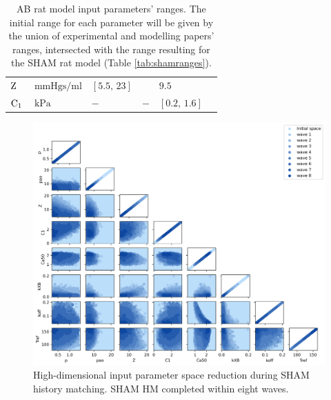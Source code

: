 \begin{landscape}
\begin{table}
\begin{tabularx}{2\textwidth}{llllll}
    $\textrm{Z}$                                                & $\SI{}{\mmHg\second\per\milli\litre}$ & $[5.5,\,23]$ & \cite{Kobayashi:1996, Yin:1980, Ioannou:2009} & $9.5$ & \cite{Lewalle:2018} \\
    $\textrm{C}_1$                                              & $\SI{}{\kilo\pascal}$                 & $-$ & $-$ & $[0.2,\,1.6]$ & \cite{Lewalle:2018} \\
    \bottomrule
    \end{tabularx}
    \caption{AB rat model input parameters' ranges. The initial range for each parameter will be given by the union of experimental and modelling papers' ranges, intersected with the range resulting for the SHAM rat model (Table \ref{tab:shamranges}).}
    \label{tab:abranges}
\end{table}
\end{landscape}


\begin{figure}[!ht]
    \myfloatalign
    \includegraphics[width=\textwidth]{figures/chapter04/hm_sham.png}
    \caption{High-dimensional input parameter space reduction during SHAM history matching. SHAM HM completed within eight waves.}
\end{figure}


